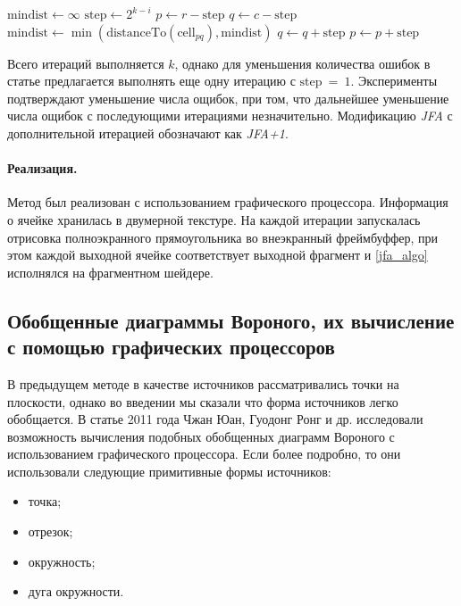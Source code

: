 \documentclass[12pt]{article}
\begin{document}
\begin{algorithmic}
\label{jfa_algo}
\State $\mathrm{mindist} \leftarrow \infty$
\State $\mathrm{step} \gets 2^{k - i}$
\State $p \gets r - \mathrm{step}$
	\State $q \gets c - \mathrm{step}$
			\State $\mathrm{mindist} \gets 
 					\min(\mathrm{distanceTo}(\mathrm{cell}_{pq}), \mathrm{mindist})$
		\EndIf
		\State $q \gets q + \mathrm{step}$
 	\EndWhile
\State $p \gets p + \mathrm{step}$
\EndWhile
\end{algorithmic}

Всего итераций выполняется $k$, однако для уменьшения количества ошибок в
статье предлагается выполнять еще одну итерацию с $\mathrm{step}~=~1$.
Эксперименты подтверждают уменьшение числа ощибок, при том, что дальнейшее
уменьшение числа ощибок с последующими итерациями незначительно. Модификацию
\emph{JFA} с дополнительной итерацией обозначают как \emph{JFA+1}.

\paragraph{Реализация.} Метод был реализован с использованием графического
процессора. Информация о ячейке хранилась в двумерной текстуре. На каждой
итерации запускалась отрисовка полноэкранного прямоугольника во внеэкранный
фреймбуффер, при этом каждой выходной ячейке соответствует выходной фрагмент
и \ref{jfa_algo} исполнялся на фрагментном шейдере. 

\subsection{Обобщенные диаграммы Вороного, их вычисление с помощью графических 
процессоров}
\label{gvd}
В предыдущем методе в качестве источников рассматривались точки на плоскости, 
однако во введении мы сказали что форма источников легко обобщается. В статье 
\cite{gvd} 2011 года Чжан Юан, Гуодонг Ронг и др. исследовали возможность
вычисления подобных обобщенных диаграмм Вороного с использованием графического 
процессора. Если более подробно, то они использовали следующие примитивные 
формы источников:
\begin{itemize}
\item точка;
\item отрезок;
\item окружность;
\item дуга окружности.
\end{itemize}
\end{document}

